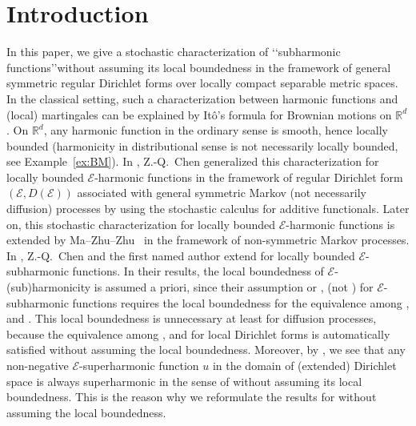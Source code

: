 \documentclass[12pt,a4paper]{article}
\newcommand{\R}{\mathbb{R}}
\newcommand{\1}{{\bf 1}}
\begin{document}
\section{Introduction}\label{sec:Intro}
In this paper, we give a stochastic characterization of \lq\lq subharmonic functions\rq\rq\;without assuming its local boundedness in the framework of 
general symmetric regular Dirichlet forms over locally compact separable metric spaces. 
In the classical setting, such a characterization between harmonic functions and (local) martingales can be explained by It\^o's formula for Brownian motions on $\R^d$. On $\R^d$, any harmonic function in the ordinary sense is  smooth, hence locally bounded (harmonicity in distributional sense is not necessarily locally bounded, see Example~\ref{ex:BM}). In \cite{Chen}, Z.-Q.~Chen generalized this characterization 
for locally bounded $\mathscr{E}$-harmonic functions in the framework of regular 
Dirichlet form $(\mathscr{E},D(\mathscr{E}))$ associated with general 
symmetric Markov (not necessarily diffusion) processes by using the 
stochastic calculus for additive functionals.   
Later on, this stochastic characterization for locally bounded  $\mathscr{E}$-harmonic functions is extended by Ma--Zhu--Zhu~\cite{MZZ} in the framework of non-symmetric Markov processes. In \cite{CK}, Z.-Q.~Chen and the first named author 
extend \cite{Chen}  
for locally bounded $\mathscr{E}$-subharmonic functions. 
In their results, the local boundedness of $\mathscr{E}$-(sub)harmonicity is assumed a priori, since their assumption \cite[(2.4)]{Chen} or \cite[(2.2)]{CK}, (not \cite[(2.5)]{CK}) for $\mathscr{E}$-subharmonic functions requires 
the local boundedness for the equivalence among \cite[(2.4)]{Chen},  \cite[(2.2)]{CK} and \cite[(2.5)]{CK}.  
This local boundedness is unnecessary at least for diffusion processes, 
because the equivalence among \cite[(2.4)]{Chen}, \cite[(2.2)]{CK} and \cite[(2.5)]{CK} for local Dirichlet forms is automatically satisfied without assuming 
the local boundedness.   
Moreover, by \cite[Lemma~3.6]{CK}, we see that any non-negative $\mathscr{E}$-superharmonic 
function $u$ in the domain of (extended) Dirichlet space is always superharmonic 
in the sense of \cite[Definition~2.1]{CK} 
without assuming its local boundedness. 
This is the reason why we reformulate the results 
for \cite{Chen,CK} without assuming the local boundedness. 
\end{document}

